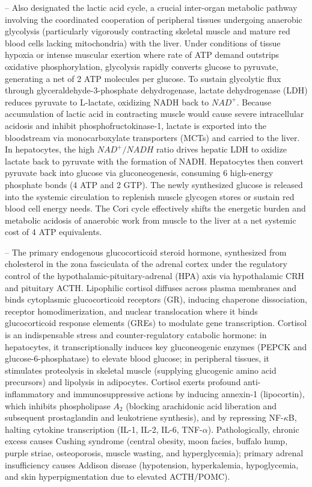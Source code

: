 -- Also designated the lactic acid cycle, a crucial inter-organ metabolic pathway involving the coordinated cooperation of peripheral tissues undergoing anaerobic glycolysis (particularly vigorously contracting skeletal muscle and mature red blood cells lacking mitochondria) with the liver. Under conditions of tissue hypoxia or intense muscular exertion where rate of ATP demand outstrips oxidative phosphorylation, glycolysis rapidly converts glucose to pyruvate, generating a net of 2 ATP molecules per glucose. To sustain glycolytic flux through glyceraldehyde-3-phosphate dehydrogenase, lactate dehydrogenase (LDH) reduces pyruvate to L-lactate, oxidizing NADH back to $NAD^+$. Because accumulation of lactic acid in contracting muscle would cause severe intracellular acidosis and inhibit phosphofructokinase-1, lactate is exported into the bloodstream via monocarboxylate transporters (MCTs) and carried to the liver. In hepatocytes, the high $NAD^+/NADH$ ratio drives hepatic LDH to oxidize lactate back to pyruvate with the formation of NADH. Hepatocytes then convert pyruvate back into glucose via gluconeogenesis, consuming 6 high-energy phosphate bonds (4 ATP and 2 GTP). The newly synthesized glucose is released into the systemic circulation to replenish muscle glycogen stores or sustain red blood cell energy needs. The Cori cycle effectively shifts the energetic burden and metabolic acidosis of anaerobic work from muscle to the liver at a net systemic cost of 4 ATP equivalents.

-- The primary endogenous glucocorticoid steroid hormone, synthesized from cholesterol in the zona fasciculata of the adrenal cortex under the regulatory control of the hypothalamic-pituitary-adrenal (HPA) axis via hypothalamic CRH and pituitary ACTH. Lipophilic cortisol diffuses across plasma membranes and binds cytoplasmic glucocorticoid receptors (GR), inducing chaperone dissociation, receptor homodimerization, and nuclear translocation where it binds glucocorticoid response elements (GREs) to modulate gene transcription. Cortisol is an indispensable stress and counter-regulatory catabolic hormone: in hepatocytes, it transcriptionally induces key gluconeogenic enzymes (PEPCK and glucose-6-phosphatase) to elevate blood glucose; in peripheral tissues, it stimulates proteolysis in skeletal muscle (supplying glucogenic amino acid precursors) and lipolysis in adipocytes. Cortisol exerts profound anti-inflammatory and immunosuppressive actions by inducing annexin-1 (lipocortin), which inhibits phospholipase $A_2$ (blocking arachidonic acid liberation and subsequent prostaglandin and leukotriene synthesis), and by repressing NF-$\kappa$B, halting cytokine transcription (IL-1, IL-2, IL-6, TNF-$\alpha$). Pathologically, chronic excess causes Cushing syndrome (central obesity, moon facies, buffalo hump, purple striae, osteoporosis, muscle wasting, and hyperglycemia); primary adrenal insufficiency causes Addison disease (hypotension, hyperkalemia, hypoglycemia, and skin hyperpigmentation due to elevated ACTH/POMC).

